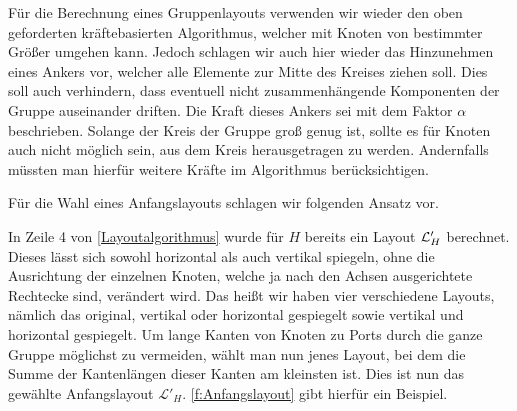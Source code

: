 Für die Berechnung eines Gruppenlayouts verwenden wir wieder den oben geforderten kräftebasierten Algorithmus, welcher mit Knoten von bestimmter Größer umgehen kann. 
Jedoch schlagen wir auch hier wieder das Hinzunehmen eines Ankers vor, welcher alle Elemente zur Mitte des Kreises ziehen soll.
Dies soll auch verhindern, dass eventuell nicht zusammenhängende Komponenten der Gruppe auseinander driften. Die Kraft dieses Ankers sei mit dem Faktor $\alpha$ beschrieben. 
Solange der Kreis der Gruppe groß genug ist, sollte es für Knoten auch nicht möglich sein, aus dem Kreis herausgetragen zu werden. 
Andernfalls müssten man hierfür weitere Kräfte im Algorithmus berücksichtigen.

Für die Wahl eines Anfangslayouts schlagen wir folgenden Ansatz vor.

In Zeile 4 von \autoref{Layoutalgorithmus} wurde für $H$ bereits ein Layout $\mathcal{L}'_H$ berechnet. 
Dieses lässt sich sowohl horizontal als auch vertikal spiegeln, ohne die Ausrichtung der einzelnen Knoten, welche ja nach den Achsen ausgerichtete Rechtecke sind, verändert wird.
Das heißt wir haben vier verschiedene Layouts, nämlich das original, vertikal oder horizontal gespiegelt sowie vertikal und horizontal gespiegelt.
Um lange Kanten von Knoten zu Ports durch die ganze Gruppe möglichst zu vermeiden, wählt man nun jenes Layout,
bei dem die Summe der Kantenlängen dieser Kanten am kleinsten ist. Dies ist nun  das gewählte Anfangslayout $\mathcal{L}'_H$.
\autoref{f:Anfangslayout} gibt hierfür ein Beispiel.

